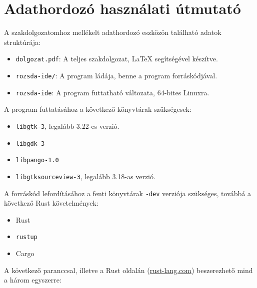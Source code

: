 \chapter*{Adathordozó használati útmutató}



\noindent A szakdolgozatomhoz mellékelt adathordozó eszközön található adatok struktúrája:

\begin{itemize}
    \item \texttt{dolgozat.pdf}: A teljes szakdolgozat, \LaTeX{} segítségével készítve.
    \item \texttt{rozsda-ide/}: A program ládája, benne a program forráskódjával.
    \item \texttt{rozsda-ide}: A program futtatható változata, 64-bites Linuxra.
\end{itemize}

\noindent A program futtatásához a következő könyvtárak szükségesek:

\begin{itemize}
    \item \texttt{libgtk-3}, legalább 3.22-es verzió.
    \item \texttt{libgdk-3}
    \item \texttt{libpango-1.0}
    \item \texttt{libgtksourceview-3}, legalább 3.18-as verzió.
\end{itemize}

\noindent A forráskód lefordításához a fenti könyvtárak \texttt{-dev} verziója szükséges,
továbbá a következő Rust követelmények:

\begin{itemize}
    \item Rust
    \item \texttt{rustup}
    \item Cargo
\end{itemize}

\noindent A következő paranccsal, illetve a Rust oldalán (\url{rust-lang.com})
beszerezhető mind a három egyszerre: 